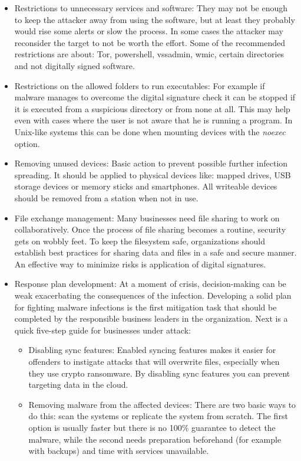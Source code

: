 \begin{itemize}
	\item Restrictions to unnecessary services and software:
They may not be enough to keep the attacker away from using the software, but at least they probably would rise some alerts or slow the process.
In some cases the attacker may reconsider the target to not be worth the effort.
Some of the recommended restrictions are about: Tor, powershell, vssadmin, wmic, certain directories and not digitally signed software.
	\item Restrictions on the allowed folders to run executables:
For example if malware manages to overcome the digital signature check it can be stopped if it is executed from a suspicious directory or from none at all.
This may help even with cases where the user is not aware that he is running a program.
In Unix-like systems this can be done when mounting devices with the \textit{noexec} option.
	\item Removing unused devices:
Basic action to prevent possible further infection spreading.
It should be applied to physical devices like: mapped drives, USB storage devices or memory sticks and smartphones.
All writeable devices should be removed from a station when not in use.
	\item File exchange management:
Many businesses need file sharing to work on collaboratively.
Once the process of file sharing becomes a routine, security gets on wobbly feet.
To keep the filesystem safe, organizations should establish best practices for sharing data and files in a safe and secure manner.
An effective way to minimize risks is application of digital signatures.
	\item Response plan development:
At a moment of crisis, decision-making can be weak exacerbating the consequences of the infection.
Developing a solid plan for fighting malware infections is the first mitigation task that should be completed by the responsible business leaders in the organization.
\linej
Next is a quick five-step guide for businesses under attack:
	\begin{itemize}
		\item Disabling sync features:
Enabled syncing features makes it easier for offenders to instigate attacks that will overwrite files, especially when they use crypto ransomware.
By disabling sync features you can prevent targeting data in the cloud.
		\item Removing malware from the affected devices:
There are two basic ways to do this: scan the systems or replicate the system from scratch.
The first option is usually faster but there is no 100\% guarantee to detect the malware, while the second needs preparation beforehand (for example with backups) and time with services unavailable.

\end{itemize}
\end{itemize}
